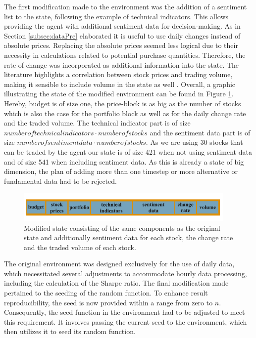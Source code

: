 \documentclass[12pt]{article}
\begin{document}
The first modification made to the environment was the addition of a sentiment list to the state, following the example of technical indicators. This allows providing the agent with additional sentiment data for decision-making. As in Section \ref{subsec:dataPre} elaborated it is useful to use daily changes instead of absolute prices. Replacing the absolute prices seemed less logical due to their necessity in calculations related to potential purchase quantities. Therefore, the rate of change was incorporated as additional information into the state. The literature highlights a correlation between stock prices and trading volume, making it sensible to include volume in the state as well \cite{campbell1993trading}\cite{gallant1992stock}. Overall, a graphic illustrating the state of the modified environment can be found in Figure \ref{fig:newState}.
Hereby, budget is of size one, the price-block is as big as the number of stocks which is also the case for the portfolio block as well as for the daily change rate and the traded volume. The technical indicator part is of size $number of technical indicators \cdot number of stocks$ and the sentiment data part is of size $ number of sentiment data \cdot number of stocks$.  
As we are using 30 stocks that can be traded by the agent our state is of size 421 when not using sentiment data and of size 541 when including sentiment data. 
As this is already a state of big dimension, the plan of adding more than one timestep or more alternative or fundamental data had to be rejected.



\begin{figure}[h]
    \centering
    \includegraphics[width=0.95\textwidth]{figs/new_Sate.pdf}
    \caption{Modified state consisting of the same components as the original state and additionally sentiment data for each stock, the change rate and the traded volume of each stock. }
    \label{fig:newState}
\end{figure}

 The original environment was designed exclusively for the use of daily data, which necessitated several adjustments to accommodate hourly data processing, including the calculation of the Sharpe ratio. 
 The final modification made pertained to the seeding of the random function. To enhance result reproducibility, the seed is now provided within a range from zero to $n$. Consequently, the seed function in the environment had to be adjusted to meet this requirement. It involves passing the current seed to the environment, which then utilizes it to seed its random function.
 
\end{document}
